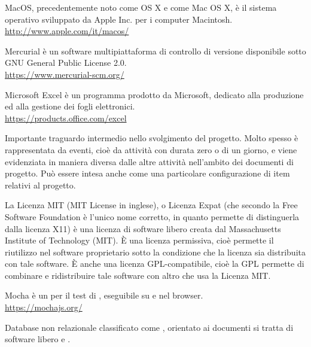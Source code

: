 MacOS, precedentemente noto come OS X e come Mac OS X, è il sistema operativo sviluppato da Apple Inc. per i computer Macintosh.\\
\url{http://www.apple.com/it/macos/}

Mercurial è un software multipiattaforma di controllo di versione disponibile sotto GNU General Public License 2.0.\\
\url{https://www.mercurial-scm.org/}

Microsoft Excel è un programma prodotto da Microsoft, dedicato alla produzione ed alla gestione dei fogli elettronici.\\
\url{https://products.office.com/excel}

Importante traguardo intermedio nello svolgimento del progetto. Molto spesso è rappresentata da eventi, cioè da attività con durata zero o di un giorno, e viene evidenziata in maniera diversa dalle altre attività nell'ambito dei documenti di progetto. Può essere intesa anche come una particolare configurazione di item relativi al progetto.

La Licenza MIT (MIT License in inglese), o Licenza Expat (che secondo la Free Software Foundation è l'unico nome corretto, in quanto permette di distinguerla dalla licenza X11) è una licenza di software libero creata dal Massachusetts Institute of Technology (MIT). \`{E} una licenza permissiva, cioè permette il riutilizzo nel software proprietario sotto la condizione che la licenza sia distribuita con tale software. \`{E} anche una licenza GPL-compatibile, cioè la GPL permette di combinare e ridistribuire tale software con altro che usa la Licenza MIT.

Mocha è un  per il test di , eseguibile su  e nel browser.\\
\url{https://mochajs.org/}

Database non relazionale classificato come , orientato ai documenti si tratta di software libero e .
\clearpage